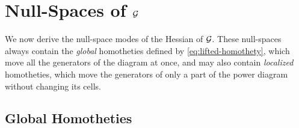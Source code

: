 \documentclass[main.tex]{subfiles}
\begin{document}
\section{Null-Spaces of $\mathcal{G}$}
\label{sec:appendix-nullspace}

We now derive the null-space modes of the Hessian of $\mathcal{G}$.
These null-spaces always contain the \emph{global} homotheties defined by \eqref{eq:lifted-homothety}, which move all the generators of the diagram at once, and may also contain \emph{localized} homotheties, which move the generators of only a part of the power diagram without changing its cells.

\subsection{Global Homotheties}
\label{sec:appendix-nullspace-homothetic}
\end{document}
